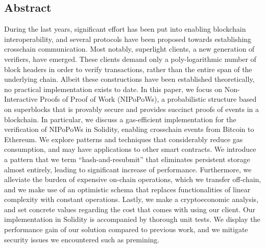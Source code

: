 \begin{center}
    \section*{Abstract}
\end{center}

During the last years, significant effort has been put into enabling blockchain
interoperability, and several protocols have been proposed towards establishing
crosschain communication. Most notably, superlight clients, a new generation of
verifiers, have emerged. These clients demand only a poly-logarithmic number of
block headers in order to verify transactions, rather than the entire span of
the underlying chain. Albeit these constructions have been established
theoretically, no practical implementation exists to date. In this paper, we
focus on Non-Interactive Proofs of Proof of Work (NIPoPoWs), a probabilistic
structure based on superblocks that is provably secure and provides succinct
proofs of events in a blockchain. In particular, we discuss a gas-efficient
implementation for the verification of NIPoPoWs in Solidity, enabling
crosschain events from Bitcoin to Ethereum. We explore patterns and techniques
that considerably reduce gas consumption, and may have applications to other
smart contracts. We introduce a pattern that we term ``hash-and-resubmit'' that
eliminates persistent storage almost entirely, leading to significant increase
of performance. Furthermore, we alleviate the burden of expensive on-chain
operations, which we transfer off-chain, and we make use of an optimistic
schema that replaces functionalities of linear complexity with constant
operations. Lastly, we make a cryptoeconomic analysis, and set concrete values
regarding the cost that comes with using our client. Our implementation in
Solidity is accompanied by thorough unit tests. We display the performance gain
of our solution compared to previous work, and we mitigate security issues we
encountered such as premining.
